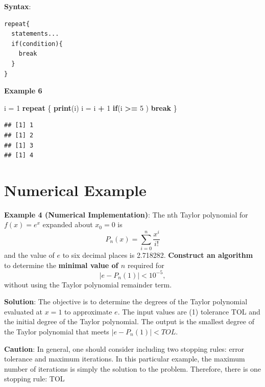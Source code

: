 \documentclass[
]{book}
\newenvironment{Shaded}{\begin{snugshade}}{\end{snugshade}}
\newcommand{\ControlFlowTok}[1]{\textcolor[rgb]{0.13,0.29,0.53}{\textbf{#1}}}
\newcommand{\DecValTok}[1]{\textcolor[rgb]{0.00,0.00,0.81}{#1}}
\newcommand{\FunctionTok}[1]{\textcolor[rgb]{0.13,0.29,0.53}{\textbf{#1}}}
\newcommand{\NormalTok}[1]{#1}
\newcommand{\OtherTok}[1]{\textcolor[rgb]{0.56,0.35,0.01}{#1}}
\newcommand{\SpecialCharTok}[1]{\textcolor[rgb]{0.81,0.36,0.00}{\textbf{#1}}}
\begin{document}
\hfill\break

\textbf{Syntax}:

\begin{verbatim}
repeat{
  statements...
  if(condition){
    break
  }
}
\end{verbatim}

\textbf{Example 6}

\begin{Shaded}
\begin{Highlighting}[]
\NormalTok{i }\OtherTok{=} \DecValTok{1}
\ControlFlowTok{repeat}\NormalTok{ \{}
  \FunctionTok{print}\NormalTok{(i)}
\NormalTok{  i }\OtherTok{=}\NormalTok{ i }\SpecialCharTok{+} \DecValTok{1}
  \ControlFlowTok{if}\NormalTok{(i }\SpecialCharTok{\textgreater{}=} \DecValTok{5}\NormalTok{ )}
    \ControlFlowTok{break}
\NormalTok{\}}
\end{Highlighting}
\end{Shaded}

\begin{verbatim}
## [1] 1
## [1] 2
## [1] 3
## [1] 4
\end{verbatim}

\hfill\break

\hypertarget{numerical-example}{%
\section{Numerical Example}\label{numerical-example}}

\textbf{Example 4 (Numerical Implementation)}: The nth Taylor polynomial for \(f (x) = e^x\) expanded about \(x_0 = 0\) is
\[
P_n(x) =\sum_{i=0}^n \frac{x^i}{i!}
\]
and the value of \(e\) to six decimal places is 2.718282. \textbf{Construct an algorithm} to determine the \textbf{minimal value of \(n\)} required for
\[
|e - P_n(1)| < 10^{-5},
\]
without using the Taylor polynomial remainder term.

\textbf{Solution}: The objective is to determine the degrees of the Taylor polynomial evaluated at \(x = 1\) to approximate \(e\). The input values are (1) tolerance TOL and the initial degree of the Taylor polynomial. The output is the smallest degree of the Taylor polynomial that meets \(|e - P_n(1)| < TOL\).

\textbf{Caution}: In general, one should consider including two stopping rules: error tolerance and maximum iterations. In this particular example, the maximum number of iterations is simply the solution to the problem. Therefore, there is one stopping rule: TOL
\end{document}
